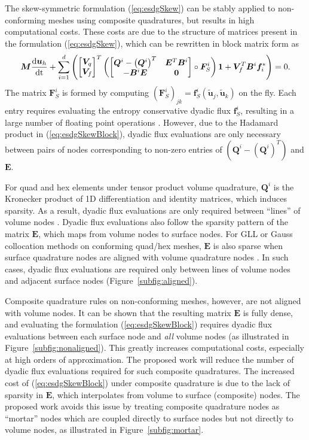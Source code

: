 \documentclass[review]{siamart0216}
\renewcommand{\tilde}{\widetilde}
\newcommand{\td}[2]{\frac{{\rm d}#1}{{\rm d}{\rm #2}}}
\newcommand{\LRp}[1]{\left( #1 \right)}
\begin{document}
The skew-symmetric formulation (\ref{eq:esdgSkew}) can be stably applied to non-conforming meshes using composite quadratures, but results in high computational costs.  These costs are due to the structure of matrices present in the formulation (\ref{eq:esdgSkew}), which can be rewritten in block matrix form as
\begin{equation}
\bm{M}\td{\bm{u}_h}{t} + \sum_{i=1}^d\LRp{\begin{bmatrix} \bm{V}_q \\ \bm{V}_f \end{bmatrix}^T
\LRp{\begin{bmatrix}
\bm{Q}^i-\LRp{\bm{Q}^i}^T & \bm{E}^T\bm{B}^i\\
-\bm{B}^i\bm{E} & \bm{0}
\end{bmatrix} \circ \bm{F}^i_S}\bm{1} + \bm{V}_f^T\bm{B}^i\bm{f}_i^*} = 0.  
\label{eq:esdgSkewBlock}
\end{equation}
The matrix $\bm{F}^i_S$ is formed by computing $\LRp{\bm{F}^i_S}_{jk} = \bm{f}^i_S\LRp{\tilde{\bm{u}}_j,\tilde{\bm{u}}_k}$ on the fly.  Each entry requires evaluating the entropy conservative dyadic flux $\bm{f}^i_S$, resulting in a large number of floating point operations \cite{wintermeyer2018entropy}.  However, due to the Hadamard product in (\ref{eq:esdgSkewBlock}), dyadic flux evaluations are only necessary between pairs of nodes corresponding to non-zero entries of  $\LRp{\bm{Q}^i-(\bm{Q}^i)^T}$ and $\bm{E}$.  

For quad and hex elements under tensor product volume quadrature, $\bm{Q}^i$ is the Kronecker product of 1D differentiation and identity matrices, which induces sparsity.  As a result, dyadic flux evaluations are only required between ``lines'' of volume nodes \cite{carpenter2014entropy, chan2018efficient}.  Dyadic flux evaluations also follow the sparsity pattern of the matrix $\bm{E}$, which maps from volume nodes to surface nodes.  For GLL or Gauss collocation methods on conforming quad/hex meshes, $\bm{E}$ is also sparse when surface quadrature nodes are aligned with volume quadrature nodes \cite{chan2018efficient}.  In such cases, dyadic flux evaluations are required only between lines of volume nodes and adjacent surface nodes  (Figure~\ref{subfig:aligned}).  

Composite quadrature rules on non-conforming meshes, however, are not aligned with volume nodes.  It can be shown that the resulting matrix $\bm{E}$ is fully dense, and evaluating the formulation (\ref{eq:esdgSkewBlock}) requires dyadic flux evaluations between each surface node and \textit{all} volume nodes (as illustrated in Figure~\ref{subfig:nonaligned}).  This greatly increases computational costs, especially at high orders of approximation.  The proposed work will reduce the number of dyadic flux evaluations required for such composite quadratures.  The increased cost of (\ref{eq:esdgSkewBlock}) under composite quadrature is due to the lack of sparsity in $\bm{E}$, which interpolates from volume to surface (composite) nodes.  The proposed work avoids this issue by treating composite quadrature nodes as ``mortar'' nodes which are coupled directly to surface nodes but not directly to volume nodes, as illustrated in Figure~\ref{subfig:mortar}.
\end{document}
